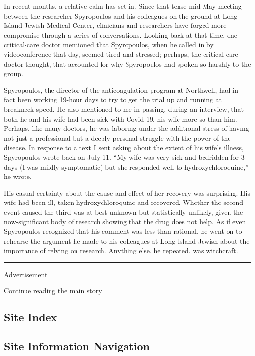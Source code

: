 In recent months, a relative calm has set in. Since that tense mid-May
meeting between the researcher Spyropoulos and his colleagues on the
ground at Long Island Jewish Medical Center, clinicians and researchers
have forged more compromise through a series of conversations. Looking
back at that time, one critical-care doctor mentioned that Spyropoulos,
when he called in by videoconference that day, seemed tired and
stressed; perhaps, the critical-care doctor thought, that accounted for
why Spyropoulos had spoken so harshly to the group.

Spyropoulos, the director of the anticoagulation program at Northwell,
had in fact been working 19-hour days to try to get the trial up and
running at breakneck speed. He also mentioned to me in passing, during
an interview, that both he and his wife had been sick with Covid-19, his
wife more so than him. Perhaps, like many doctors, he was laboring under
the additional stress of having not just a professional but a deeply
personal struggle with the power of the disease. In response to a text I
sent asking about the extent of his wife's illness, Spyropoulos wrote
back on July 11. ``My wife was very sick and bedridden for 3 days (I was
mildly symptomatic) but she responded well to hydroxychloroquine,'' he
wrote.

His casual certainty about the cause and effect of her recovery was
surprising. His wife had been ill, taken hydroxychloroquine and
recovered. Whether the second event caused the third was at best unknown
but statistically unlikely, given the now-significant body of research
showing that the drug does not help. As if even Spyropoulos recognized
that his comment was less than rational, he went on to rehearse the
argument he made to his colleagues at Long Island Jewish about the
importance of relying on research. Anything else, he repeated, was
witchcraft.

\begin{center}\rule{0.5\linewidth}{\linethickness}\end{center}

Advertisement

\protect\hyperlink{after-bottom}{Continue reading the main story}

\hypertarget{site-index}{%
\subsection{Site Index}\label{site-index}}

\hypertarget{site-information-navigation}{%
\subsection{Site Information
Navigation}\label{site-information-navigation}}

